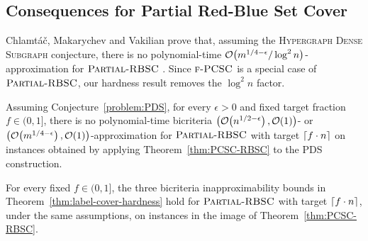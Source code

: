 \subsection{Consequences for Partial Red-Blue Set Cover}

Chlamt\'a\v{c}, Makarychev and Vakilian prove that, assuming the \textsc{Hypergraph Dense Subgraph} conjecture, there is no polynomial-time $\mathcal{O}\mathopen{}\left( m^{1/4-\epsilon}/\log^2 n \right)$-approximation for $\textup{\textsc{Partial-RBSC}}$ \cite[Theorem~6]{RedBlueSetCover}. Since $\textup{\textsc{f-PCSC}}$ is a special case of $\textup{\textsc{Partial-RBSC}}$, our hardness result removes the $\log^2 n$ factor.

\begin{corollary}\label{cor:PRBSC-PDS-hardness}
    Assuming Conjecture~\ref{problem:PDS}, for every $\epsilon>0$ and fixed target fraction $f\in(0,1]$, there is no polynomial-time bicriteria $\mathopen{}\left( \mathcal{O}\mathopen{}\left( n^{1/2-\epsilon} \right),\mathcal{O}\mathopen{}\left( 1 \right) \right)$- or $\mathopen{}\left( \mathcal{O}\mathopen{}\left( m^{1/4-\epsilon} \right),\mathcal{O}\mathopen{}\left( 1 \right) \right)$-approximation for $\textup{\textsc{Partial-RBSC}}$ with target $\mathopen{}\left\lceil f\cdot n \right\rceil$ on instances obtained by applying Theorem~\ref{thm:PCSC-RBSC} to the PDS construction.
\end{corollary}

\begin{corollary}\label{cor:PRBSC-label-cover-hardness}\label{cor:PRBSC-PGC-hardness}
    For every fixed $f\in(0,1]$, the three bicriteria inapproximability bounds in Theorem~\ref{thm:label-cover-hardness} hold for $\textup{\textsc{Partial-RBSC}}$ with target $\mathopen{}\left\lceil f\cdot n \right\rceil$, under the same assumptions, on instances in the image of Theorem~\ref{thm:PCSC-RBSC}.
\end{corollary}
